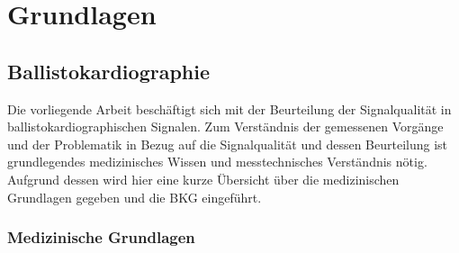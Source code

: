 \chapter{Grundlagen}\label{grundlagen}

\section{Ballistokardiographie}

Die vorliegende Arbeit beschäftigt sich mit der Beurteilung der Signalqualität in ballistokardiographischen Signalen. Zum Verständnis der gemessenen Vorgänge und der Problematik in Bezug auf die Signalqualität und dessen Beurteilung ist grundlegendes medizinisches Wissen und messtechnisches Verständnis nötig. Aufgrund dessen wird hier eine kurze Übersicht über die medizinischen Grundlagen gegeben und die \acl{BKG} eingeführt.
	\subsection{Medizinische Grundlagen}
	
